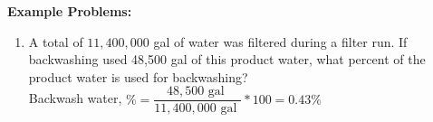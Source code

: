 \begin{enumerate}
\textbf{Example Problems:}\\
\begin{enumerate}[1.]
\item A total of $11,400,000$ gal of water was filtered during a filter run. If backwashing used 48,500 gal of this product water, what percent of the product water is used for backwashing?\\
\vspace{0.2cm}
Backwash water, $\%=\dfrac{48,500 \text { gal }}{11,400,000 \text { gal }} * 100 = \boxed{0.43 \%}$
\end{enumerate}
\end{enumerate}
